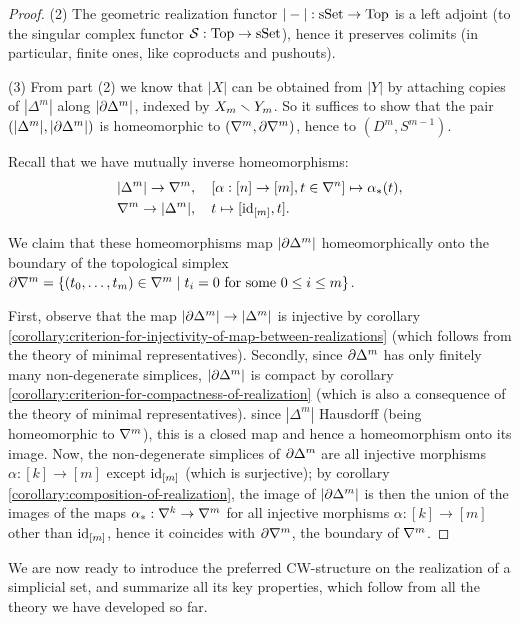 \begin{proof}
(2) The geometric realization functor $|-|:{\mathrm{sSet}}\to{\mathrm{Top}}$ is a left adjoint (to the singular complex functor $\mathcal{S}:{\mathrm{Top}}\to{\mathrm{sSet}}$), hence it preserves colimits (in particular, finite ones, like coproducts and pushouts).

(3) From part (2) we know that $|X|$ can be obtained from $|Y|$ by attaching copies of $|\Delta^m|$ along $|\partial\Delta^m|$, indexed by $X_m\smallsetminus Y_m$. So it suffices to show that the pair $(|\Delta^m|,|\partial\Delta^m|)$ is homeomorphic to $(\nabla^{m},\partial\nabla^{m})$, hence to $(D^m,S^{m-1})$.

Recall that we have mutually inverse homeomorphisms:
\begin{align*}
    |\Delta^m|\to\nabla^{m}&,\quad [\alpha:[n]\to[m],t\in\nabla^n]\mapsto\alpha_*(t),\\
    \nabla^{m}\to|\Delta^m|&,\quad t\mapsto[\operatorname{id}_{[m]},t].
\end{align*}

We claim that these homeomorphisms map $|\partial\Delta^m|$ homeomorphically onto the boundary of the topological simplex $\partial\nabla^{m}=\{({{t}_0,\dots,{t}_{m}})\in\nabla^{m}\mid t_i=0\text{ for some }0\le i\le m\}$.

First, observe that the map $|\partial\Delta^m|\to|\Delta^m|$ is injective by corollary \ref{corollary:criterion-for-injectivity-of-map-between-realizations} (which follows from the theory of minimal representatives). Secondly, since $\partial\Delta^m$ has only finitely many non-degenerate simplices, $|\partial\Delta^m|$ is compact by corollary \ref{corollary:criterion-for-compactness-of-realization} (which is also a consequence of the theory of minimal representatives). since $|\Delta^m|$ Hausdorff (being homeomorphic to $\nabla^{m}$), this is a closed map and hence a homeomorphism onto its image. Now, the non-degenerate simplices of $\partial\Delta^m$ are all injective morphisms $\alpha:[k]\to[m]$ except $\operatorname{id}_{[m]}$ (which is surjective); by corollary \ref{corollary:composition-of-realization}, the image of $|\partial\Delta^m|$ is then the union of the images of the maps $\alpha_*:\nabla^{k}\to\nabla^{m}$ for all injective morphisms $\alpha:[k]\to[m]$ other than $\operatorname{id}_{[m]}$, hence it coincides with $\partial\nabla^{m}$, the boundary of $\nabla^{m}$.
\end{proof}

We are now ready to introduce the preferred CW-structure on the realization of a simplicial set, and summarize all its key properties, which follow from all the theory we have developed so far.

